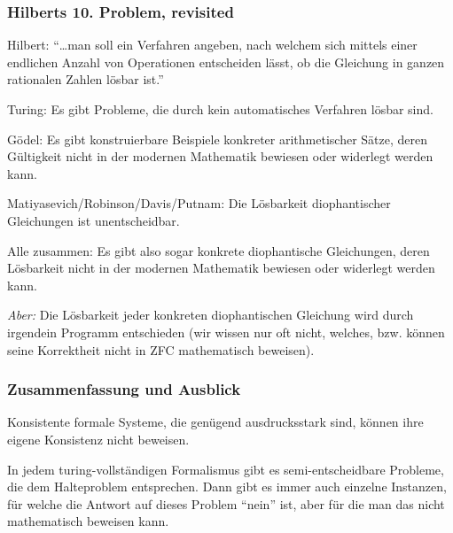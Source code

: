 \documentclass[aspectratio=1610,onlymath]{beamer}
\begin{document}
\begin{frame}\frametitle{Hilberts 10. Problem, revisited}

\alert{Hilbert:} "`\ldots man soll ein Verfahren angeben, nach welchem sich mittels einer endlichen Anzahl von Operationen entscheiden lässt, ob die Gleichung in ganzen rationalen Zahlen lösbar ist."'
\bigskip\pause

\alert{Turing:} Es gibt Probleme, die durch kein automatisches Verfahren lösbar sind.
\medskip\pause

\alert{Gödel:} Es gibt konstruierbare Beispiele konkreter arithmetischer Sätze, deren Gültigkeit nicht in der modernen Mathematik bewiesen oder widerlegt werden kann.
\medskip\pause

\alert{Matiyasevich/Robinson/Davis/Putnam:} Die Lösbarkeit diophantischer Gleichungen ist
unentscheidbar.
\medskip\pause

\alert{Alle zusammen:} Es gibt also sogar konkrete diophantische Gleichungen, deren Lösbarkeit nicht in der modernen Mathematik bewiesen oder widerlegt werden kann.\medskip\pause

{\tiny
\emph{Aber:} Die Lösbarkeit jeder konkreten diophantischen Gleichung wird durch irgendein Programm entschieden (wir wissen nur oft nicht, welches, bzw. können seine Korrektheit nicht in ZFC mathematisch beweisen).

}

\end{frame}

\begin{frame}\frametitle{Zusammenfassung und Ausblick}

Konsistente formale Systeme, die genügend ausdrucksstark sind, können ihre eigene Konsistenz nicht beweisen.
\bigskip

In jedem turing-vollständigen Formalismus gibt es semi-entscheidbare Probleme, die dem Halteproblem entsprechen.
Dann gibt es immer auch einzelne Instanzen, für welche die Antwort auf dieses Problem "`nein"' ist, aber für die
man das nicht mathematisch beweisen kann.
\bigskip


\end{frame}
\end{document}
